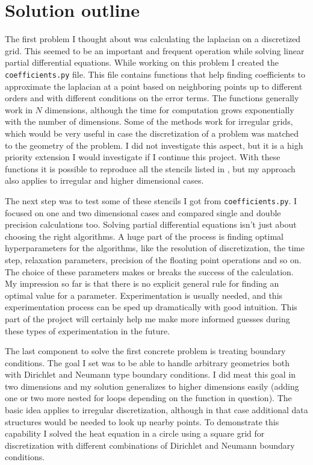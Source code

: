 \documentclass[pdftex,12pt,a4paper]{article}
\newcommand{\ctexttt}[1]{\colorbox{cverbbg}{\texttt{#1}}}
\begin{document}
	\section{Solution outline}
		The first problem I thought about was calculating the laplacian on a discretized grid. This seemed to be an important and frequent operation while solving linear partial differential equations. While working on this problem I created the \ctexttt{coefficients.py} file. This file contains functions that help finding coefficients to approximate the laplacian at a point based on neighboring points up to different orders and with different conditions on the error terms. The functions generally work in $N$ dimensions, although the time for computation grows exponentially with the number of dimensions. Some of the methods work for irregular grids, which would be very useful in case the discretization of a problem was matched to the geometry of the problem. I did not investigate this aspect, but it is a high priority extension I would investigate if I continue this project. With these functions it is possible to reproduce all the stencils listed in \cite{patra}, but my approach also applies to irregular and higher dimensional cases.
		
		The next step was to test some of these stencils I got from \ctexttt{coefficients.py}. I focused on one and two dimensional cases and compared single and double precision calculations too. Solving partial differential equations isn't just about choosing the right algorithms. A huge part of the process is finding optimal hyperparameters for the algorithms, like the resolution of discretization, the time step, relaxation parameters, precision of the floating point operations and so on. The choice of these parameters makes or breaks the success of the calculation. My impression so far is that there is no explicit general rule for finding an optimal value for a parameter. Experimentation is usually needed, and this experimentation process can be sped up dramatically with good intuition. This part of the project will certainly help me make more informed guesses during these types of experimentation in the future.
		
		The last component to solve the first concrete problem is treating boundary conditions. The goal I set was to be able to handle arbitrary geometries both with Dirichlet and Neumann type boundary conditions. I did meat this goal in two dimensions and my solution generalizes to higher dimensions easily (adding one or two more nested for loops depending on the function in question). The basic idea applies to irregular discretization, although in that case additional data structures would be needed to look up nearby points. To demonstrate this capability I solved the heat equation in a circle using a square grid for discretization with different combinations of Dirichlet and Neumann boundary conditions. \cite{gaussian,conduction}
\end{document}
